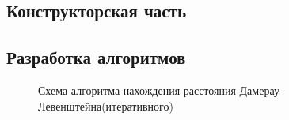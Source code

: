 \documentclass[a4paper, 14pt]{article}
\begin{document}
    \begin{center}
    	\newpage
        \section{Конструкторская часть}
        \subsection{Разработка алгоритмов}
        \begin{figure}[h]
			\caption{Схема алгоритма нахождения расстояния Дамерау-Левенштейна(итеративного)}
			\label{ris:image}
		\end{figure}
		\newpage
        \begin{figure}[h]

\end{figure}
\end{center}
\end{document}
